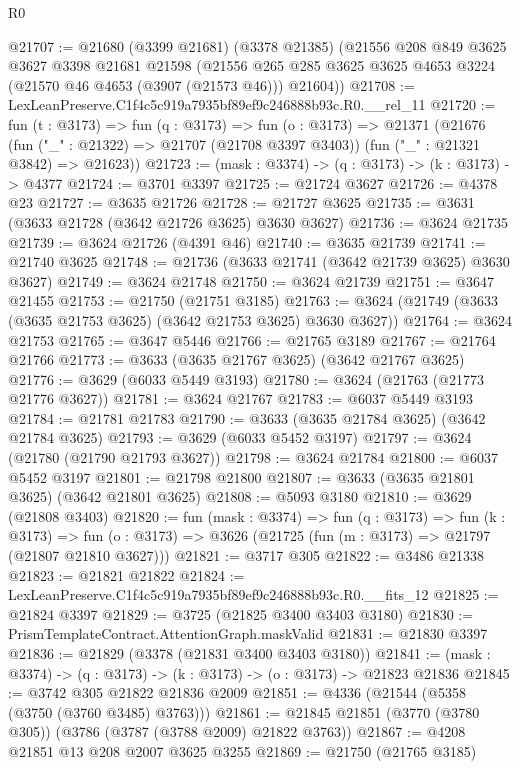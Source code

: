 \begin{lexlean}{R0}
\begin{coremodule}
@21707 := @21680
    (@3399 @21681)
    (@3378 @21385)
    (@21556
      @208
      @849
      @3625
      @3627
      @3398
      @21681
      @21598
      (@21556 @265 @285 @3625 @3625 @4653 @3224 (@21570 @46 @4653 (@3907 (@21573 @46))) @21604))
@21708 := LexLeanPreserve.C1f4c5c919a7935bf89ef9c246888b93c.R0.__rel_11
@21720 := fun (t : @3173) =>
  fun (q : @3173) =>
  fun (o : @3173) =>
  @21371
    (@21676
      (fun ("_" : @21322) => @21707 (@21708 @3397 @3403))
      (fun ("_" : @21321 @3842) => @21623))
@21723 := (mask : @3374) -> (q : @3173) -> (k : @3173) -> @4377
@21724 := @3701 @3397
@21725 := @21724 @3627
@21726 := @4378 @23
@21727 := @3635 @21726
@21728 := @21727 @3625
@21735 := @3631 (@3633 @21728 (@3642 @21726 @3625) @3630 @3627)
@21736 := @3624 @21735
@21739 := @3624 @21726 (@4391 @46)
@21740 := @3635 @21739
@21741 := @21740 @3625
@21748 := @21736 (@3633 @21741 (@3642 @21739 @3625) @3630 @3627)
@21749 := @3624 @21748
@21750 := @3624 @21739
@21751 := @3647 @21455
@21753 := @21750 (@21751 @3185)
@21763 := @3624 (@21749 (@3633 (@3635 @21753 @3625) (@3642 @21753 @3625) @3630 @3627))
@21764 := @3624 @21753
@21765 := @3647 @5446
@21766 := @21765 @3189
@21767 := @21764 @21766
@21773 := @3633 (@3635 @21767 @3625) (@3642 @21767 @3625)
@21776 := @3629 (@6033 @5449 @3193)
@21780 := @3624 (@21763 (@21773 @21776 @3627))
@21781 := @3624 @21767
@21783 := @6037 @5449 @3193
@21784 := @21781 @21783
@21790 := @3633 (@3635 @21784 @3625) (@3642 @21784 @3625)
@21793 := @3629 (@6033 @5452 @3197)
@21797 := @3624 (@21780 (@21790 @21793 @3627))
@21798 := @3624 @21784
@21800 := @6037 @5452 @3197
@21801 := @21798 @21800
@21807 := @3633 (@3635 @21801 @3625) (@3642 @21801 @3625)
@21808 := @5093 @3180
@21810 := @3629 (@21808 @3403)
@21820 := fun (mask : @3374) =>
  fun (q : @3173) =>
  fun (k : @3173) =>
  fun (o : @3173) => @3626 (@21725 (fun (m : @3173) => @21797 (@21807 @21810 @3627)))
@21821 := @3717 @305
@21822 := @3486 @21338
@21823 := @21821 @21822
@21824 := LexLeanPreserve.C1f4c5c919a7935bf89ef9c246888b93c.R0.__fits_12
@21825 := @21824 @3397
@21829 := @3725 (@21825 @3400 @3403 @3180)
@21830 := PrismTemplateContract.AttentionGraph.maskValid
@21831 := @21830 @3397
@21836 := @21829 (@3378 (@21831 @3400 @3403 @3180))
@21841 := (mask : @3374) -> (q : @3173) -> (k : @3173) -> (o : @3173) -> @21823 @21836
@21845 := @3742 @305 @21822 @21836 @2009
@21851 := @4336 (@21544 (@5358 (@3750 (@3760 @3485) @3763)))
@21861 := @21845 @21851 (@3770 (@3780 @305)) (@3786 (@3787 (@3788 @2009) @21822 @3763))
@21867 := @4208 @21851 @13 @208 @2007 @3625 @3255
@21869 := @21750 (@21765 @3185)

\end{coremodule}
\end{lexlean}
